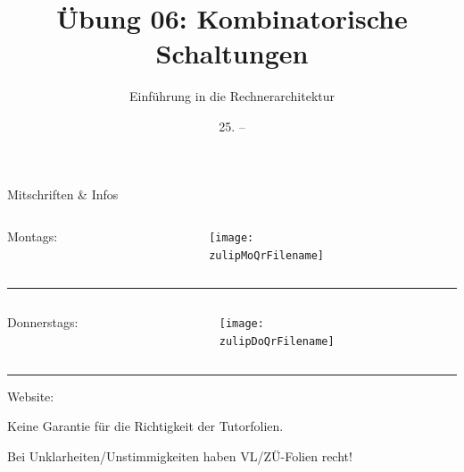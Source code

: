 \documentclass[
  german,            %
  aspectratio=169,    %
]{tumbeamer}
\title{Übung 06: Kombinatorische Schaltungen}
\subtitle{Einführung in die Rechnerarchitektur}
\author{\theAuthorName}
\institute{\theGroupName\\\theSchoolName\\\theUniversityName}
\date{25. -- \DTMdisplaydate{2024}{11}{31}{-1}}
\begin{document}
\maketitle

\begin{frame}[c]{Mitschriften \& Infos}{}
  \begin{minipage}[t]{\textwidth}
    \begin{columns}[c]
      \begin{column}{0.8\textwidth}
        Montags: \href{\zulipMo}{\zulipMo}
      \end{column}
      \begin{column}{0.2\textwidth}
        \texttt{[image: \\zulipMoQrFilename]}
      \end{column}
    \end{columns}
  \end{minipage}
  \rule{\textwidth}{0.4pt}
  \begin{minipage}[t]{\textwidth}
    \begin{columns}[c]
      \begin{column}{0.8\textwidth}
        Donnerstags: \href{\zulipDo}{\zulipDo}
      \end{column}
      \begin{column}{0.2\textwidth}
        \texttt{[image: \\zulipDoQrFilename]}
      \end{column}
    \end{columns}
  \end{minipage}
  \ifdefined\myWebsite
  \rule{\textwidth}{0.4pt}
  \centering
  Website: \href{\myWebsite}{\myWebsite}
  \fi
\end{frame}

\begin{frame}[c]{}{}
  \begin{center}
    \LARGE  Keine Garantie für die Richtigkeit der Tutorfolien.

    \Large Bei Unklarheiten/Unstimmigkeiten haben VL/ZÜ-Folien recht!
  \end{center}
\end{frame}
\end{document}
